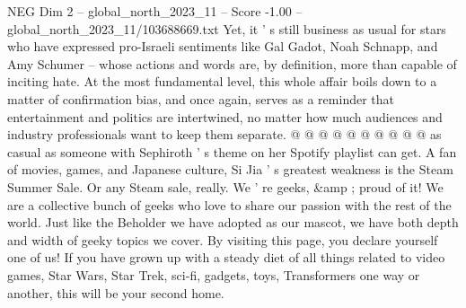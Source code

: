 \begin{textsample}{NEG Dim 2 – global\_north\_2023\_11 – Score -1.00 – global\_north\_2023\_11/103688669.txt}
Yet, it ' s still business as usual for stars who have expressed pro-Israeli sentiments like Gal Gadot, Noah Schnapp, and Amy Schumer -- whose actions and words are, by definition, more than capable of inciting hate.
At the most fundamental level, this whole affair boils down to a matter of confirmation bias, and once again, serves as a reminder that entertainment and politics are intertwined, no matter how much audiences and industry professionals want to keep them separate. @ @ @ @ @ @ @ @ @ @ as casual as someone with Sephiroth ' s theme on her Spotify playlist can get.
A fan of movies, games, and Japanese culture, Si Jia ' s greatest weakness is the Steam Summer Sale.
Or any Steam sale, really.
We ' re geeks, \&amp ; proud of it!
We are a collective bunch of geeks who love to share our passion with the rest of the world.
Just like the Beholder we have adopted as our mascot, we have both depth and width of geeky topics we cover.
By visiting this page, you declare yourself one of us!
If you have grown up with a steady diet of all things related to video games, Star Wars, Star Trek, sci-fi, gadgets, toys, Transformers one way or another, this will be your second home.

\end{textsample}
